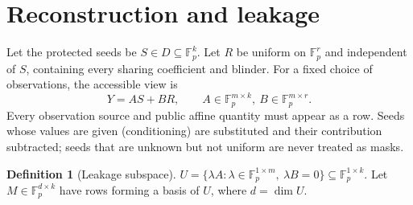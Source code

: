 \documentclass[pdflatex,sn-mathphys-num]{sn-jnl}
\theoremstyle{plain}
\theoremstyle{definition}
\newtheorem{definition}[theorem]{Definition}
\newcommand{\F}{\mathbb{F}}
\begin{document}
\section{Reconstruction and leakage}\label{sec:leakage}

Let the protected seeds be $S\in D\subseteq\F_p^k$. Let $R$ be uniform on $\F_p^r$ and independent of $S$, containing every sharing coefficient and blinder. For a fixed choice of observations, the accessible view is
\begin{equation}\label{eq:view}
 Y=AS+BR,\qquad A\in\F_p^{m\times k},\ B\in\F_p^{m\times r}.
\end{equation}
Every observation source and public affine quantity must appear as a row. Seeds whose values are given (conditioning) are substituted and their contribution subtracted; seeds that are unknown but not uniform are never treated as masks.

\begin{definition}[Leakage subspace]
$U=\{\lambda A:\lambda\in\F_p^{1\times m},\ \lambda B=0\}\subseteq\F_p^{1\times k}$. Let $M\in\F_p^{d\times k}$ have rows forming a basis of $U$, where $d=\dim U$.
\end{definition}
\end{document}
